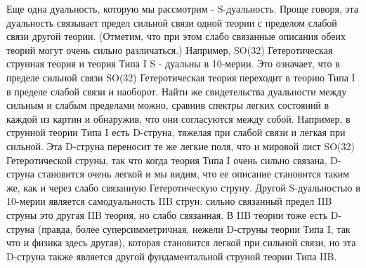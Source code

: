 Еще одна дуальность, которую мы рассмотрим - S-дуальность. Проще говоря, эта дуальность связывает предел сильной связи одной теории с пределом слабой связи другой теории. (Отметим, что при этом слабо связанные описания обеих теорий могут очень сильно различаться.) Например, SO(32) Гетеротическая струнная теория и теория Типа I S - дуальны в 10-мерии. Это означает, что в пределе сильной связи SO(32) Гетеротическая теория переходит в теорию Типа I в пределе слабой связи и наоборот. Найти же свидетельства дуальности между сильным и слабым пределами можно, сравнив спектры легких состояний в каждой из картин и обнаружив, что они согласуются между собой. Например, в струнной теории Типа I есть D-струна, тяжелая при слабой связи и легкая при сильной. Эта D-струна переносит те же легкие поля, что и мировой лист SO(32) Гетеротической струны, так что когда теория Типа I очень сильно связана, D-струна становится очень легкой и мы видим, что ее описание становится таким же, как и через слабо связанную Гетеротическую струну. Другой S-дуальностью в 10-мерии является самодуальность IIB струн: сильно связанный предел IIB струны это другая IIB теория, но слабо связанная. В IIB теории тоже есть D-струна (правда, более суперсимметричная, нежели D-струны теории Типа I, так что и физика здесь другая), которая становится легкой при сильной связи, но эта D-струна также является другой фундаментальной струной теории Типа IIB.